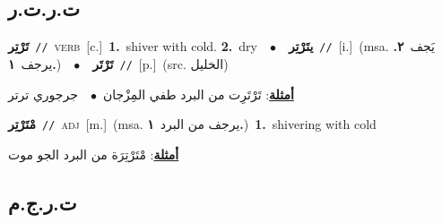 \documentclass[10pt,a4paper,twoside]{article} %
\begin{document}
\begin{multicols}{2}
{{{{\vspace{-3mm}
\subsection*{\color{blue}\foreignlanguage{arabic}{ت.ر.ت.ر}\color{blue}{}} 

{\setlength\topsep{0pt}\textbf{\foreignlanguage{arabic}{تَرْتِر}}\ {\color{gray}\texttt{//}\color{black}}\ \textsc{verb}\ [c.]\ \textbf{1.}~shiver with cold.  \textbf{2.}~dry\ \ $\bullet$\ \ \setlength\topsep{0pt}\textbf{\foreignlanguage{arabic}{يتَرْتِر}}\ {\color{gray}\texttt{//}\color{black}}\ [i.]\ \color{gray}(msa. \foreignlanguage{arabic}{يَجف}~\foreignlanguage{arabic}{\textbf{٢.}}  \foreignlanguage{arabic}{يرجف}~\foreignlanguage{arabic}{\textbf{١.}})\color{black}\ \ $\bullet$\ \ \setlength\topsep{0pt}\textbf{\foreignlanguage{arabic}{تَرْتَر}}\ {\color{gray}\texttt{//}\color{black}}\ [p.]\ (src. \color{gray}\foreignlanguage{arabic}{الخليل}\color{black})\  \begin{flushright}\color{gray}\foreignlanguage{arabic}{\textbf{\underline{\foreignlanguage{arabic}{أمثلة}}}: تَرْتَرِت من البرد طفي المِزْجان\ $\bullet$\ \  جرجوري ترتر }\end{flushright}\color{black}} \vspace{2mm}

{\setlength\topsep{0pt}\textbf{\foreignlanguage{arabic}{مْتَرْتِر}}\ {\color{gray}\texttt{//}\color{black}}\ \textsc{adj}\ [m.]\ \color{gray}(msa. \foreignlanguage{arabic}{يرجف من البرد}~\foreignlanguage{arabic}{\textbf{١.}})\color{black}\ \textbf{1.}~shivering with cold\  \begin{flushright}\color{gray}\foreignlanguage{arabic}{\textbf{\underline{\foreignlanguage{arabic}{أمثلة}}}: مْتَرْتِرَة من البرد الجو موت}\end{flushright}\color{black}} \vspace{2mm}

\vspace{-3mm}
\subsection*{\color{blue}\foreignlanguage{arabic}{ت.ر.ج.م}\color{blue}{}} 

}}}}
\end{multicols}
\end{document}
